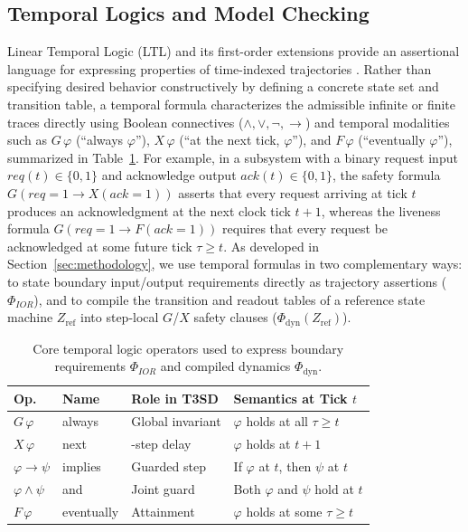\subsection{Temporal Logics and Model Checking}
\label{sec:background-ltl}
Linear Temporal Logic (LTL) and its first-order extensions provide an assertional language for expressing properties of time-indexed trajectories \citep{Pnueli1977,MannaPnueli1995,BaierKatoen2008,VardiWolper1986,Thomas1990}. Rather than specifying desired behavior constructively by defining a concrete state set and transition table, a temporal formula characterizes the admissible infinite or finite traces directly using Boolean connectives ($\wedge,\vee,\neg,\rightarrow$) and temporal modalities such as $G\,\varphi$ (``always $\varphi$''), $X\,\varphi$ (``at the next tick, $\varphi$''), and $F\,\varphi$ (``eventually $\varphi$''), summarized in Table~\ref{tab:ltl-operators}. For example, in a subsystem with a binary request input $\mathit{req}(t)\in\{0,1\}$ and acknowledge output $\mathit{ack}(t)\in\{0,1\}$, the safety formula $G(\mathit{req}=1 \rightarrow X(\mathit{ack}=1))$ asserts that every request arriving at tick $t$ produces an acknowledgment at the next clock tick $t+1$, whereas the liveness formula $G(\mathit{req}=1 \rightarrow F(\mathit{ack}=1))$ requires that every request be acknowledged at some future tick $\tau\ge t$. As developed in Section~\ref{sec:methodology}, we use temporal formulas in two complementary ways: to state boundary input/output requirements directly as trajectory assertions ($\Phi_{IOR}$), and to compile the transition and readout tables of a reference state machine $Z_{\mathrm{ref}}$ into step-local $G$/$X$ safety clauses ($\Phi_{\mathrm{dyn}}(Z_{\mathrm{ref}})$).

\begin{table}[t]
\caption{Core temporal logic operators used to express boundary requirements $\Phi_{IOR}$ and compiled dynamics $\Phi_{\mathrm{dyn}}$.}
\label{tab:ltl-operators}
\renewcommand{\arraystretch}{1.2}
\footnotesize
\setlength{\tabcolsep}{4pt}
\begin{tabularx}{\columnwidth}{@{}l l >{\raggedright\arraybackslash}p{} >{\raggedright\arraybackslash}X@{}}
    \toprule
    \textbf{Op.} & \textbf{Name} & \textbf{Role in T3SD} & \textbf{Semantics at Tick $t$} \\
    \midrule
    $G\,\varphi$ & always & Global invariant & $\varphi$ holds at all $\tau \ge t$ \\
    $X\,\varphi$ & next & 1-step delay & $\varphi$ holds at $t+1$ \\
    $\varphi \rightarrow \psi$ & implies & Guarded step & If $\varphi$ at $t$, then $\psi$ at $t$ \\
    $\varphi \wedge \psi$ & and & Joint guard & Both $\varphi$ and $\psi$ hold at $t$ \\
    $F\,\varphi$ & eventually & Attainment & $\varphi$ holds at some $\tau \ge t$ \\
    \bottomrule
\end{tabularx}
\end{table}

